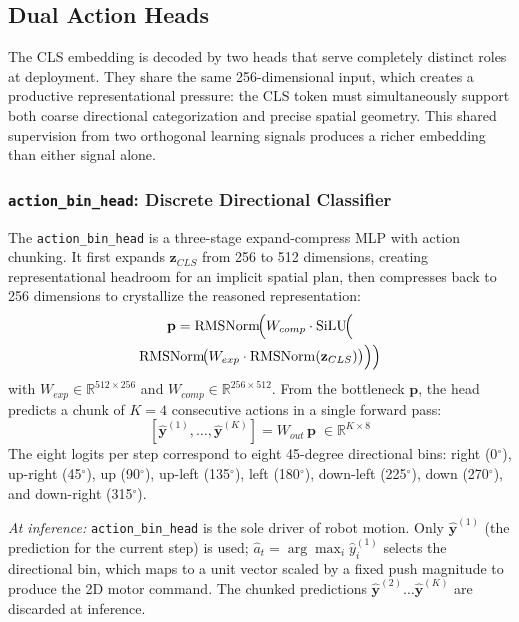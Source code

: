 \documentclass[letterpaper]{article} %
\begin{document}
\subsection{Dual Action Heads}

The CLS embedding is decoded by two heads that serve completely distinct roles at deployment. They share the same 256-dimensional input, which creates a productive representational pressure: the CLS token must simultaneously support both coarse directional categorization and precise spatial geometry. This shared supervision from two orthogonal learning signals produces a richer embedding than either signal alone.

\subsubsection{\texttt{action\_bin\_head}: Discrete Directional Classifier}

The \texttt{action\_bin\_head} is a three-stage expand-compress MLP with action chunking. It first expands $\mathbf{z}_{CLS}$ from 256 to 512 dimensions, creating representational headroom for an implicit spatial plan, then compresses back to 256 dimensions to crystallize the reasoned representation:
\begin{multline}
\mathbf{p} = \mathrm{RMSNorm}\!\Bigl(W_{comp} \cdot \mathrm{SiLU}\!\Bigl( \\
\mathrm{RMSNorm}\!\bigl(W_{exp} \cdot \mathrm{RMSNorm}(\mathbf{z}_{CLS})\bigr)\Bigr)\Bigr)
\end{multline}
with $W_{exp} \in \mathbb{R}^{512 \times 256}$ and $W_{comp} \in \mathbb{R}^{256 \times 512}$. From the bottleneck $\mathbf{p}$, the head predicts a chunk of $K{=}4$ consecutive actions in a single forward pass:
\begin{equation}
\left[\hat{\mathbf{y}}^{(1)}, \ldots, \hat{\mathbf{y}}^{(K)}\right] = W_{out}\,\mathbf{p} \;\in \mathbb{R}^{K \times 8}
\end{equation}
The eight logits per step correspond to eight 45-degree directional bins: right (0$^\circ$), up-right (45$^\circ$), up (90$^\circ$), up-left (135$^\circ$), left (180$^\circ$), down-left (225$^\circ$), down (270$^\circ$), and down-right (315$^\circ$).

\textit{At inference:} \texttt{action\_bin\_head} is the sole driver of robot motion. Only $\hat{\mathbf{y}}^{(1)}$ (the prediction for the current step) is used; $\hat{a}_t = \arg\max_i \hat{y}^{(1)}_i$ selects the directional bin, which maps to a unit vector scaled by a fixed push magnitude to produce the 2D motor command. The chunked predictions $\hat{\mathbf{y}}^{(2)}\ldots\hat{\mathbf{y}}^{(K)}$ are discarded at inference.
\end{document}

